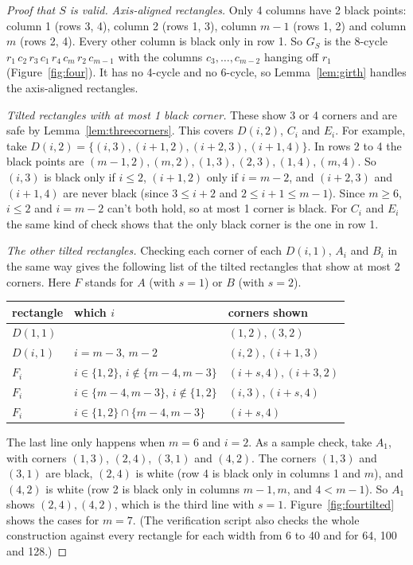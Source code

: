\documentclass[11pt]{article}
\theoremstyle{definition}
\theoremstyle{remark}
\begin{document}
\begin{proof}[Proof that $S$ is valid]
\emph{Axis-aligned rectangles.} Only 4 columns have 2 black points: column 1 (rows 3, 4), column
2 (rows 1, 3), column $m-1$ (rows 1, 2) and column $m$ (rows 2, 4). Every other column is black
only in row 1. So $G_S$ is the 8-cycle
$r_1\,c_2\,r_3\,c_1\,r_4\,c_m\,r_2\,c_{m-1}$ with the columns $c_3,\ldots,c_{m-2}$ hanging off
$r_1$ (Figure~\ref{fig:four}). It has no 4-cycle and no 6-cycle, so Lemma~\ref{lem:girth}
handles the axis-aligned rectangles.

\emph{Tilted rectangles with at most 1 black corner.} These show 3 or 4 corners and are safe by
Lemma~\ref{lem:threecorners}. This covers $D(i,2)$, $C_i$ and $E_i$. For example, take
$D(i,2)=\{(i,3),(i+1,2),(i+2,3),(i+1,4)\}$. In rows 2 to 4 the black points are
$(m-1,2),(m,2),(1,3),(2,3),(1,4),(m,4)$. So $(i,3)$ is black only if $i\le2$, $(i+1,2)$ only
if $i=m-2$, and $(i+2,3)$ and $(i+1,4)$ are never black (since $3\le i+2$ and
$2\le i+1\le m-1$). Since $m\ge6$, $i\le2$ and $i=m-2$ can't both hold, so at most 1 corner is
black. For $C_i$ and $E_i$ the same kind of check shows that the only black corner is the one in
row 1.

\emph{The other tilted rectangles.} Checking each corner of each $D(i,1)$, $A_i$ and $B_i$ in
the same way gives the following list of the tilted rectangles that show at most 2 corners. Here
$F$ stands for $A$ (with $s=1$) or $B$ (with $s=2$).
\begin{center}\small
\begin{tabular}{lll}
\toprule
rectangle & which $i$ & corners shown\\
\midrule
$D(1,1)$ & & $(1,2),(3,2)$\\
$D(i,1)$ & $i=m-3,\,m-2$ & $(i,2),(i+1,3)$\\
$F_i$ & $i\in\{1,2\}$, $i\notin\{m-4,m-3\}$ & $(i+s,4),(i+3,2)$\\
$F_i$ & $i\in\{m-4,m-3\}$, $i\notin\{1,2\}$ & $(i,3),(i+s,4)$\\
$F_i$ & $i\in\{1,2\}\cap\{m-4,m-3\}$ & $(i+s,4)$\\
\bottomrule
\end{tabular}
\end{center}
The last line only happens when $m=6$ and $i=2$. As a sample check, take $A_1$, with corners $(1,3)$, $(2,4)$,
$(3,1)$ and $(4,2)$. The corners $(1,3)$ and $(3,1)$ are black, $(2,4)$ is white (row 4 is black only in columns 1
and $m$), and $(4,2)$ is white (row 2 is black only in columns $m-1,m$, and $4<m-1$). So $A_1$
shows $(2,4),(4,2)$, which is the third line with $s=1$. Figure~\ref{fig:fourtilted} shows the
cases for $m=7$. (The verification script also checks the whole construction against every
rectangle for each width from 6 to 40 and for 64, 100 and 128.)


\end{proof}
\end{document}
